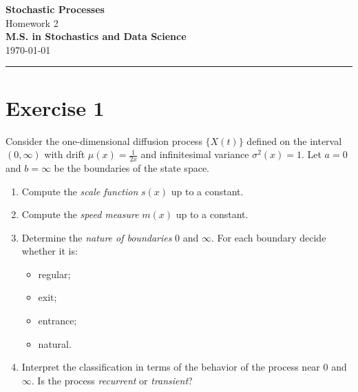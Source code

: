 \documentclass[12pt]{article}
\begin{document}
	\textcolor{UM_Brown}{
		\begin{center}
			\textbf{\Large Stochastic Processes}\\
			\vspace{5pt}
			Homework 2 \\
			\vspace{5pt}
			\textbf{M.S. in Stochastics and Data Science}\\
			\vspace{20pt}
			\vspace{5pt}
			\today
		\end{center}
		\vspace{10pt}
		\hrule
	}
	
	
	
	
	\section*{Exercise 1}
	Consider the one-dimensional diffusion process $\{X(t)\}$ defined on the interval $(0,\infty)$ with drift $\mu(x)=\frac{1}{2x}$ and infinitesimal variance $\sigma^{2}(x)=1$. Let $a=0$ and $b=\infty$ be the boundaries of the state space.
	\begin{enumerate}
		\item Compute the \emph{scale function} $s(x)$ up to a constant.
		\item Compute the \emph{speed measure} $m(x)$ up to a constant.
		\item Determine the \emph{nature of boundaries} $0$ and $\infty$. For each boundary decide whether it is: 
		\begin{itemize}
			\item regular;
			\item exit;
			\item entrance;
			\item natural.
		\end{itemize}
		\item Interpret the classification in terms of the behavior of the process near $0$ and $\infty$. Is the process \emph{recurrent} or \emph{transient}?
	\end{enumerate}
\end{document}
